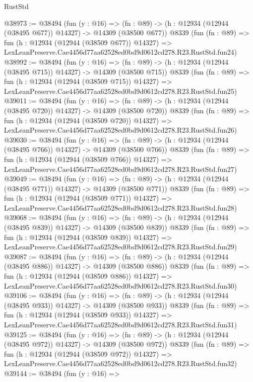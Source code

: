 \begin{lexlean}{RustStd}
\begin{coremodule}
@38973 := @38494
    (fun (y : @16) =>
    (fn : @89) -> (h : @12934 (@12944 (@38495 @677)) @14327) -> @14309 (@38500 @677))
    @8339
    (fun (fn : @89) =>
    fun (h : @12934 (@12944 (@38509 @677)) @14327) =>
    LexLeanPreserve.Cae4456d77aa62528ed0bd9d0612cd278.R23.RustStd.fun24)
@38992 := @38494
    (fun (y : @16) =>
    (fn : @89) -> (h : @12934 (@12944 (@38495 @715)) @14327) -> @14309 (@38500 @715))
    @8339
    (fun (fn : @89) =>
    fun (h : @12934 (@12944 (@38509 @715)) @14327) =>
    LexLeanPreserve.Cae4456d77aa62528ed0bd9d0612cd278.R23.RustStd.fun25)
@39011 := @38494
    (fun (y : @16) =>
    (fn : @89) -> (h : @12934 (@12944 (@38495 @720)) @14327) -> @14309 (@38500 @720))
    @8339
    (fun (fn : @89) =>
    fun (h : @12934 (@12944 (@38509 @720)) @14327) =>
    LexLeanPreserve.Cae4456d77aa62528ed0bd9d0612cd278.R23.RustStd.fun26)
@39030 := @38494
    (fun (y : @16) =>
    (fn : @89) -> (h : @12934 (@12944 (@38495 @766)) @14327) -> @14309 (@38500 @766))
    @8339
    (fun (fn : @89) =>
    fun (h : @12934 (@12944 (@38509 @766)) @14327) =>
    LexLeanPreserve.Cae4456d77aa62528ed0bd9d0612cd278.R23.RustStd.fun27)
@39049 := @38494
    (fun (y : @16) =>
    (fn : @89) -> (h : @12934 (@12944 (@38495 @771)) @14327) -> @14309 (@38500 @771))
    @8339
    (fun (fn : @89) =>
    fun (h : @12934 (@12944 (@38509 @771)) @14327) =>
    LexLeanPreserve.Cae4456d77aa62528ed0bd9d0612cd278.R23.RustStd.fun28)
@39068 := @38494
    (fun (y : @16) =>
    (fn : @89) -> (h : @12934 (@12944 (@38495 @839)) @14327) -> @14309 (@38500 @839))
    @8339
    (fun (fn : @89) =>
    fun (h : @12934 (@12944 (@38509 @839)) @14327) =>
    LexLeanPreserve.Cae4456d77aa62528ed0bd9d0612cd278.R23.RustStd.fun29)
@39087 := @38494
    (fun (y : @16) =>
    (fn : @89) -> (h : @12934 (@12944 (@38495 @886)) @14327) -> @14309 (@38500 @886))
    @8339
    (fun (fn : @89) =>
    fun (h : @12934 (@12944 (@38509 @886)) @14327) =>
    LexLeanPreserve.Cae4456d77aa62528ed0bd9d0612cd278.R23.RustStd.fun30)
@39106 := @38494
    (fun (y : @16) =>
    (fn : @89) -> (h : @12934 (@12944 (@38495 @933)) @14327) -> @14309 (@38500 @933))
    @8339
    (fun (fn : @89) =>
    fun (h : @12934 (@12944 (@38509 @933)) @14327) =>
    LexLeanPreserve.Cae4456d77aa62528ed0bd9d0612cd278.R23.RustStd.fun31)
@39125 := @38494
    (fun (y : @16) =>
    (fn : @89) -> (h : @12934 (@12944 (@38495 @972)) @14327) -> @14309 (@38500 @972))
    @8339
    (fun (fn : @89) =>
    fun (h : @12934 (@12944 (@38509 @972)) @14327) =>
    LexLeanPreserve.Cae4456d77aa62528ed0bd9d0612cd278.R23.RustStd.fun32)
@39144 := @38494
    (fun (y : @16) =>

\end{coremodule}
\end{lexlean}
